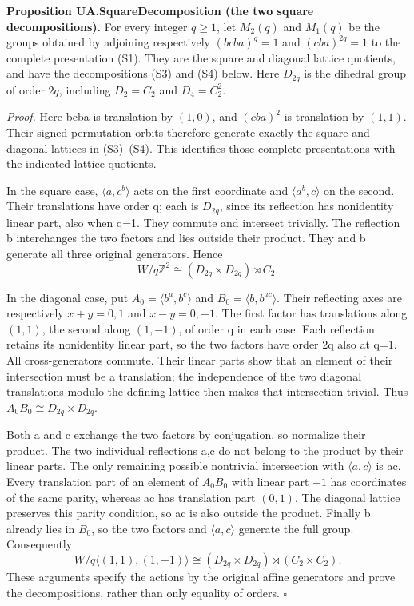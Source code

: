 \textbf{Proposition UA.SquareDecomposition (the two square
decompositions).} For every integer \(q\ge1\), let \(M_2(q)\) and
\(M_1(q)\) be the groups obtained by adjoining respectively
\((bcba)^q=1\) and \((cba)^{2q}=1\) to the complete presentation (S1).
They are the square and diagonal lattice quotients, and have the
decompositions (S3) and (S4) below. Here \(D_{2q}\) is the dihedral
group of order \(2q\), including \(D_2=C_2\) and \(D_4=C_2^2\).

\emph{Proof.} Here bcba is translation by \((1,0)\), and \((cba)^2\) is
translation by \((1,1)\). Their signed-permutation orbits therefore
generate exactly the square and diagonal lattices in (S3)--(S4). This
identifies those complete presentations with the indicated lattice
quotients.

In the square case, \(\langle a,c^b\rangle\) acts on the first
coordinate and \(\langle a^b,c\rangle\) on the second. Their
translations have order q; each is \(D_{2q}\), since its reflection has
nonidentity linear part, also when q=1. They commute and intersect
trivially. The reflection b interchanges the two factors and lies
outside their product. They and b generate all three original
generators. Hence \[
 W/q\mathbb Z^2\cong(D_{2q}\times D_{2q})\rtimes C_2.
 \tag{S3}
\]

In the diagonal case, put \(A_0=\langle b^a,b^c\rangle\) and
\(B_0=\langle b,b^{ac}\rangle\). Their reflecting axes are respectively
\(x+y=0,1\) and \(x-y=0,-1\). The first factor has translations along
\((1,1)\), the second along \((1,-1)\), of order q in each case. Each
reflection retains its nonidentity linear part, so the two factors have
order 2q also at q=1. All cross-generators commute. Their linear parts
show that an element of their intersection must be a translation; the
independence of the two diagonal translations modulo the defining
lattice then makes that intersection trivial. Thus
\(A_0B_0\cong D_{2q}\times D_{2q}\).

Both a and c exchange the two factors by conjugation, so normalize their
product. The two individual reflections a,c do not belong to the product
by their linear parts. The only remaining possible nontrivial
intersection with \(\langle a,c\rangle\) is ac. Every translation part
of an element of \(A_0B_0\) with linear part \(-1\) has coordinates of
the same parity, whereas ac has translation part \((0,1)\). The diagonal
lattice preserves this parity condition, so ac is also outside the
product. Finally b already lies in \(B_0\), so the two factors and
\(\langle a,c\rangle\) generate the full group. Consequently \[
 W/q\langle(1,1),(1,-1)\rangle
 \cong(D_{2q}\times D_{2q})\rtimes(C_2\times C_2).
 \tag{S4}
\] These arguments specify the actions by the original affine generators
and prove the decompositions, rather than only equality of orders.
\(\square\)
